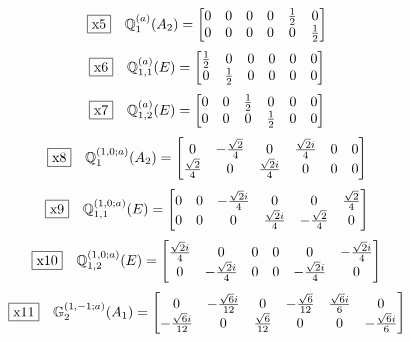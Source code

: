 \documentclass[fleqn,10pt,landscape]{jsarticle}
\begin{document}
\begin{dmath*}
\fbox{x5}\quad \mathbb{Q}_{1}^{(a)}(A_{2})=\begin{bmatrix} 0 & 0 & 0 & 0 & \frac{1}{2} & 0 \\ 0 & 0 & 0 & 0 & 0 & \frac{1}{2} \end{bmatrix}
\end{dmath*}
\begin{dmath*}
\fbox{x6}\quad \mathbb{Q}_{1,1}^{(a)}(E)=\begin{bmatrix} \frac{1}{2} & 0 & 0 & 0 & 0 & 0 \\ 0 & \frac{1}{2} & 0 & 0 & 0 & 0 \end{bmatrix}
\end{dmath*}
\begin{dmath*}
\fbox{x7}\quad \mathbb{Q}_{1,2}^{(a)}(E)=\begin{bmatrix} 0 & 0 & \frac{1}{2} & 0 & 0 & 0 \\ 0 & 0 & 0 & \frac{1}{2} & 0 & 0 \end{bmatrix}
\end{dmath*}
\begin{dmath*}
\fbox{x8}\quad \mathbb{Q}_{1}^{(1,0;a)}(A_{2})=\begin{bmatrix} 0 & - \frac{\sqrt{2}}{4} & 0 & \frac{\sqrt{2} i}{4} & 0 & 0 \\ \frac{\sqrt{2}}{4} & 0 & \frac{\sqrt{2} i}{4} & 0 & 0 & 0 \end{bmatrix}
\end{dmath*}
\begin{dmath*}
\fbox{x9}\quad \mathbb{Q}_{1,1}^{(1,0;a)}(E)=\begin{bmatrix} 0 & 0 & - \frac{\sqrt{2} i}{4} & 0 & 0 & \frac{\sqrt{2}}{4} \\ 0 & 0 & 0 & \frac{\sqrt{2} i}{4} & - \frac{\sqrt{2}}{4} & 0 \end{bmatrix}
\end{dmath*}
\begin{dmath*}
\fbox{x10}\quad \mathbb{Q}_{1,2}^{(1,0;a)}(E)=\begin{bmatrix} \frac{\sqrt{2} i}{4} & 0 & 0 & 0 & 0 & - \frac{\sqrt{2} i}{4} \\ 0 & - \frac{\sqrt{2} i}{4} & 0 & 0 & - \frac{\sqrt{2} i}{4} & 0 \end{bmatrix}
\end{dmath*}
\begin{dmath*}
\fbox{x11}\quad \mathbb{G}_{2}^{(1,-1;a)}(A_{1})=\begin{bmatrix} 0 & - \frac{\sqrt{6} i}{12} & 0 & - \frac{\sqrt{6}}{12} & \frac{\sqrt{6} i}{6} & 0 \\ - \frac{\sqrt{6} i}{12} & 0 & \frac{\sqrt{6}}{12} & 0 & 0 & - \frac{\sqrt{6} i}{6} \end{bmatrix}
\end{dmath*}
\end{document}

